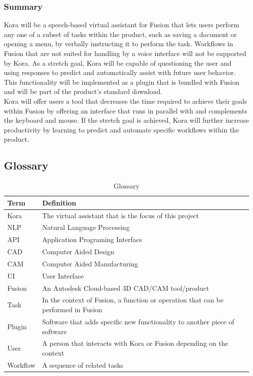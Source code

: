 \documentclass[onecolumn, draftclsnofoot,10pt, compsoc]{IEEEtran}
\newcommand{\newpara}{\\[0.1in]}
\def \botname{Kora\xspace}
\begin{document}
	\subsubsection{Summary}
	\botname will be a speech-based virtual assistant for Fusion that lets users perform any one of a subset of tasks within the product, such as saving a document or opening a menu, by verbally instructing it to perform the task.
	Workflows in Fusion that are not suited for handling by a voice interface will not be supported by \botname.
	As a stretch goal, \botname will be capable of questioning the user and using responses to predict and automatically assist with future user behavior.
	This functionality will be implemented as a plugin that is bundled with Fusion and will be part of the product's standard download.
	\newpara
	\botname will offer users a tool that decreases the time required to achieve their goals within Fusion by offering an interface that runs in parallel with and complements the keyboard and mouse.
	If the stretch goal is achieved, \botname will further increase productivity by learning to predict and automate specific workflows within the product.

	\subsection{Glossary}
	\begin{table}[H]
		\centering
		\caption{Glossary}
		\label{my-label}
		\begin{tabular}{|l|l|}
			\hline
			\textbf{Term} & \textbf{Definition} \\ \hline
			\botname & The virtual assistant that is the focus of this project \\ \hline
			NLP & Natural Language Processing \\ \hline
			API & Application Programing Interface \\ \hline
			CAD & Computer Aided Design \\ \hline
			CAM & Computer Aided Manufacturing \\ \hline
			UI & User Interface \\ \hline
			Fusion & An Autodesk Cloud-based 3D CAD/CAM tool/product \\ \hline
			Task & In the context of Fusion, a function or operation that can be performed in Fusion \\ \hline
			Plugin & Software that adds specific new functionality to another piece of software \\ \hline
			User & A person that interacts with \botname or Fusion depending on the context \\ \hline
			Workflow & A sequence of related tasks \\ \hline
		\end{tabular}
	\end{table}
\end{document}
